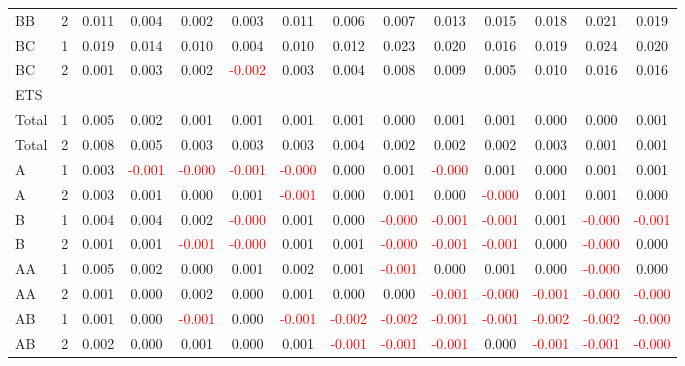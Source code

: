 \begin{table}[!htb]
{\begin{tabular}{llcccccccccccc}
BB & 2 & 0.011 & 0.004 & 0.002 & 0.003 & 0.011 & 0.006 & 0.007 & 0.013 & 0.015 & 0.018 & 0.021 & 0.019\\
BC & 1 & 0.019 & 0.014 & 0.010 & 0.004 & 0.010 & 0.012 & 0.023 & 0.020 & 0.016 & 0.019 & 0.024 & 0.020\\
BC & 2 & 0.001 & 0.003 & 0.002 & \textcolor{red}{-0.002} & 0.003 & 0.004 & 0.008 & 0.009 & 0.005 & 0.010 & 0.016 & 0.016\\
\hline
ETS &  &  &  &  &  &  &  &  &  &  &  &  & \\
\hline
Total & 1 & 0.005 & 0.002 & 0.001 & 0.001 & 0.001 & 0.001 & 0.000 & 0.001 & 0.001 & 0.000 & 0.000 & 0.001\\
Total & 2 & 0.008 & 0.005 & 0.003 & 0.003 & 0.003 & 0.004 & 0.002 & 0.002 & 0.002 & 0.003 & 0.001 & 0.001\\
A & 1 & 0.003 & \textcolor{red}{-0.001} & \textcolor{red}{-0.000} & \textcolor{red}{-0.001} & \textcolor{red}{-0.000} & 0.000 & 0.001 & \textcolor{red}{-0.000} & 0.001 & 0.000 & 0.001 & 0.001\\
A & 2 & 0.003 & 0.001 & 0.000 & 0.001 & \textcolor{red}{-0.001} & 0.000 & 0.001 & 0.000 & \textcolor{red}{-0.000} & 0.001 & 0.001 & 0.000\\
B & 1 & 0.004 & 0.004 & 0.002 & \textcolor{red}{-0.000} & 0.001 & 0.000 & \textcolor{red}{-0.000} & \textcolor{red}{-0.001} & \textcolor{red}{-0.001} & 0.001 & \textcolor{red}{-0.000} & \textcolor{red}{-0.001}\\
B & 2 & 0.001 & 0.001 & \textcolor{red}{-0.001} & \textcolor{red}{-0.000} & 0.001 & 0.001 & \textcolor{red}{-0.000} & \textcolor{red}{-0.001} & \textcolor{red}{-0.001} & 0.000 & \textcolor{red}{-0.000} & 0.000\\
AA & 1 & 0.005 & 0.002 & 0.000 & 0.001 & 0.002 & 0.001 & \textcolor{red}{-0.001} & 0.000 & 0.001 & 0.000 & \textcolor{red}{-0.000} & 0.000\\
AA & 2 & 0.001 & 0.000 & 0.002 & 0.000 & 0.001 & 0.000 & 0.000 & \textcolor{red}{-0.001} & \textcolor{red}{-0.000} & \textcolor{red}{-0.001} & \textcolor{red}{-0.000} & \textcolor{red}{-0.000}\\
AB & 1 & 0.001 & 0.000 & \textcolor{red}{-0.001} & 0.000 & \textcolor{red}{-0.001} & \textcolor{red}{-0.002} & \textcolor{red}{-0.002} & \textcolor{red}{-0.001} & \textcolor{red}{-0.001} & \textcolor{red}{-0.002} & \textcolor{red}{-0.002} & \textcolor{red}{-0.000}\\
AB & 2 & 0.002 & 0.000 & 0.001 & 0.000 & 0.001 & \textcolor{red}{-0.001} & \textcolor{red}{-0.001} & \textcolor{red}{-0.001} & 0.000 & \textcolor{red}{-0.001} & \textcolor{red}{-0.001} & \textcolor{red}{-0.000}\\

\end{tabular}}
\end{table}
